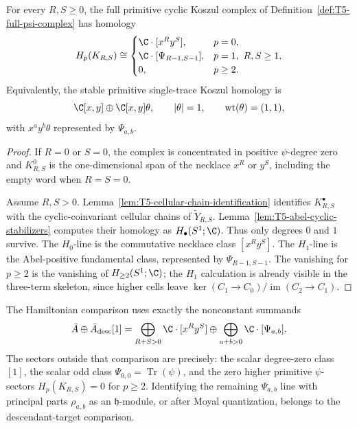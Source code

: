 \begin{thm}
  \label{thm:T5-full-primitive-psi-homology}
  For every \(R,S\ge0\), the full primitive cyclic Koszul complex of
  Definition~\ref{def:T5-full-psi-complex} has homology
  \[
    H_p(K_{R,S})\cong
    \begin{cases}
      \C\cdot[x^Ry^S],&p=0,\\
      \C\cdot[\Psi_{R-1,S-1}],&p=1,\ R,S\ge1,\\
      0,&p\ge2.
    \end{cases}
  \]
  Equivalently, the stable primitive single-trace Koszul homology is
  \[
    \C[x,y]\oplus\C[x,y]\theta,\qquad
    |\theta|=1,\qquad \operatorname{wt}(\theta)=(1,1),
  \]
  with \(x^ay^b\theta\) represented by \(\Psi_{a,b}\).
\end{thm}

\begin{proof}
  If \(R=0\) or \(S=0\), the complex is concentrated in positive
  \(\psi\)-degree zero and \(K^0_{R,S}\) is the one-dimensional span of
  the necklace \(x^R\) or \(y^S\), including the empty word when \(R=S=0\).

  Assume \(R,S>0\).  Lemma~\ref{lem:T5-cellular-chain-identification}
  identifies \(K^\bullet_{R,S}\) with the cyclic-coinvariant cellular
  chains of \(\widetilde Y_{R,S}\).  Lemma~\ref{lem:T5-abel-cyclic-stabilizers}
  computes their homology as \(H_\bullet(S^1;\C)\).  Thus only degrees
  \(0\) and \(1\) survive.  The \(H_0\)-line is the commutative necklace
  class \([x^Ry^S]\).  The \(H_1\)-line is the Abel-positive fundamental
  class, represented by \(\Psi_{R-1,S-1}\).
  The vanishing for \(p\ge2\) is the vanishing of \(H_{\ge2}(S^1;\C)\);
  the \(H_1\) calculation is already visible in the three-term skeleton,
  since higher cells leave
  \(\ker(C_1\to C_0)/\operatorname{im}(C_2\to C_1)\).
\end{proof}

\begin{thm}
  \label{thm:T5-hamiltonian-sector-extraction}
  The Hamiltonian comparison uses exactly the nonconstant summands
  \[
    \bar A\oplus \bar A_{\mathrm{desc}}[1]
      =
    \bigoplus_{R+S>0}\C\cdot[x^Ry^S]
      \oplus
    \bigoplus_{a+b>0}\C\cdot[\Psi_{a,b}].
  \]
  The sectors outside that comparison are precisely:
  the scalar degree-zero class \([1]\), the scalar odd class
  \(\Psi_{0,0}=\operatorname{Tr}(\psi)\), and the zero higher
  primitive \(\psi\)-sectors \(H_p(K_{R,S})=0\) for \(p\ge2\).
  Identifying the remaining \(\Psi_{a,b}\) line with principal parts
  \(\rho_{a,b}\) as an \(\mathfrak h\)-module, or after Moyal
  quantization, belongs to the descendant-target comparison.
\end{thm}

